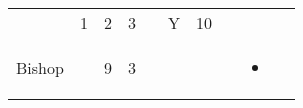 \documentclass[12pt]{article}
\begin{document}
\begin{longtable}[]{@{}llllllllll@{}}
\begin{minipage}[t]{0.06\columnwidth}
\strut\end{minipage} &
\begin{minipage}[t]{0.06\columnwidth}\raggedright\strut
1
\strut\end{minipage} &
\begin{minipage}[t]{0.06\columnwidth}\raggedright\strut
2
\strut\end{minipage} &
\begin{minipage}[t]{0.06\columnwidth}\raggedright\strut
3
\strut\end{minipage} &
\begin{minipage}[t]{0.06\columnwidth}\raggedright\strut
\strut\end{minipage} &
\begin{minipage}[t]{0.07\columnwidth}\raggedright\strut
Y
\strut\end{minipage} &
\begin{minipage}[t]{0.08\columnwidth}\raggedright\strut
10
\strut\end{minipage}\tabularnewline
\begin{minipage}[t]{0.13\columnwidth}\raggedright\strut
Bishop
\strut\end{minipage} &
\begin{minipage}[t]{0.06\columnwidth}\raggedright\strut
\strut\end{minipage} &
\begin{minipage}[t]{0.06\columnwidth}\raggedright\strut
9
\strut\end{minipage} &
\begin{minipage}[t]{0.06\columnwidth}\raggedright\strut
3
\strut\end{minipage} &
\begin{minipage}[t]{0.06\columnwidth}\raggedright\strut
\strut\end{minipage} &
\begin{minipage}[t]{0.06\columnwidth}\raggedright\strut
\strut\end{minipage} &
\begin{minipage}[t]{0.06\columnwidth}\raggedright\strut
\strut\end{minipage} &
\begin{minipage}[t]{0.06\columnwidth}\raggedright\strut
\strut\end{minipage} &
\begin{minipage}[t]{0.07\columnwidth}\raggedright\strut
\begin{itemize}
\item
\end{itemize}
\strut\end{minipage} &

\end{longtable}
\end{document}
